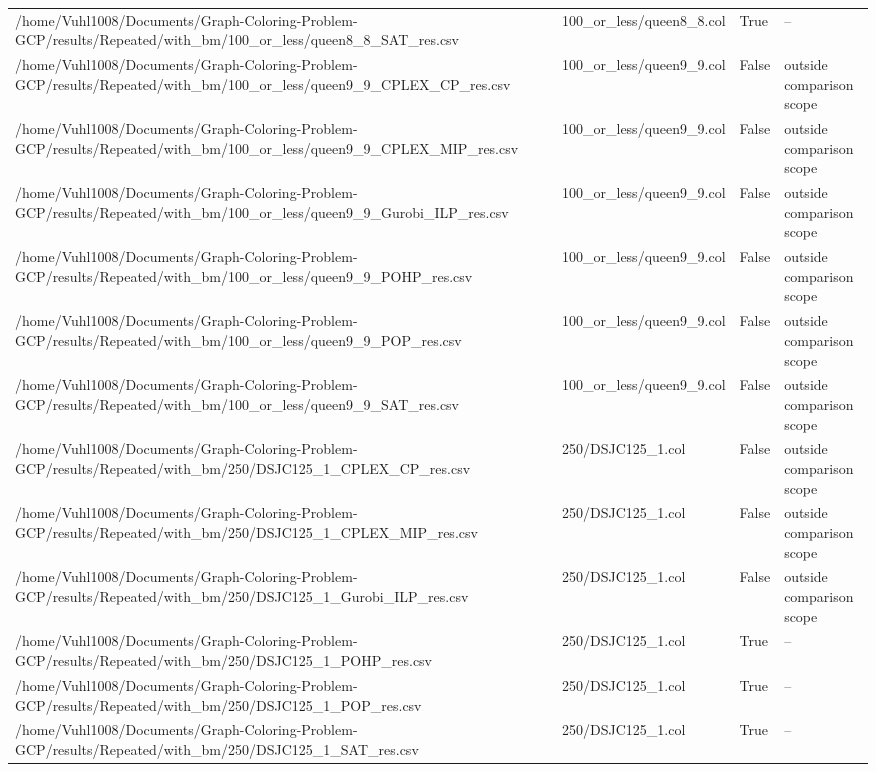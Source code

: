 \begin{table}[htbp]
\begin{tabular}{llll}
/home/Vuhl1008/Documents/Graph-Coloring-Problem-GCP/results/Repeated/with\_bm/100\_or\_less/queen8\_8\_SAT\_res.csv & 100\_or\_less/queen8\_8.col & True & -- \\
/home/Vuhl1008/Documents/Graph-Coloring-Problem-GCP/results/Repeated/with\_bm/100\_or\_less/queen9\_9\_CPLEX\_CP\_res.csv & 100\_or\_less/queen9\_9.col & False & outside comparison scope \\
/home/Vuhl1008/Documents/Graph-Coloring-Problem-GCP/results/Repeated/with\_bm/100\_or\_less/queen9\_9\_CPLEX\_MIP\_res.csv & 100\_or\_less/queen9\_9.col & False & outside comparison scope \\
/home/Vuhl1008/Documents/Graph-Coloring-Problem-GCP/results/Repeated/with\_bm/100\_or\_less/queen9\_9\_Gurobi\_ILP\_res.csv & 100\_or\_less/queen9\_9.col & False & outside comparison scope \\
/home/Vuhl1008/Documents/Graph-Coloring-Problem-GCP/results/Repeated/with\_bm/100\_or\_less/queen9\_9\_POHP\_res.csv & 100\_or\_less/queen9\_9.col & False & outside comparison scope \\
/home/Vuhl1008/Documents/Graph-Coloring-Problem-GCP/results/Repeated/with\_bm/100\_or\_less/queen9\_9\_POP\_res.csv & 100\_or\_less/queen9\_9.col & False & outside comparison scope \\
/home/Vuhl1008/Documents/Graph-Coloring-Problem-GCP/results/Repeated/with\_bm/100\_or\_less/queen9\_9\_SAT\_res.csv & 100\_or\_less/queen9\_9.col & False & outside comparison scope \\
/home/Vuhl1008/Documents/Graph-Coloring-Problem-GCP/results/Repeated/with\_bm/250/DSJC125\_1\_CPLEX\_CP\_res.csv & 250/DSJC125\_1.col & False & outside comparison scope \\
/home/Vuhl1008/Documents/Graph-Coloring-Problem-GCP/results/Repeated/with\_bm/250/DSJC125\_1\_CPLEX\_MIP\_res.csv & 250/DSJC125\_1.col & False & outside comparison scope \\
/home/Vuhl1008/Documents/Graph-Coloring-Problem-GCP/results/Repeated/with\_bm/250/DSJC125\_1\_Gurobi\_ILP\_res.csv & 250/DSJC125\_1.col & False & outside comparison scope \\
/home/Vuhl1008/Documents/Graph-Coloring-Problem-GCP/results/Repeated/with\_bm/250/DSJC125\_1\_POHP\_res.csv & 250/DSJC125\_1.col & True & -- \\
/home/Vuhl1008/Documents/Graph-Coloring-Problem-GCP/results/Repeated/with\_bm/250/DSJC125\_1\_POP\_res.csv & 250/DSJC125\_1.col & True & -- \\
/home/Vuhl1008/Documents/Graph-Coloring-Problem-GCP/results/Repeated/with\_bm/250/DSJC125\_1\_SAT\_res.csv & 250/DSJC125\_1.col & True & -- \\

\end{tabular}
\end{table}
